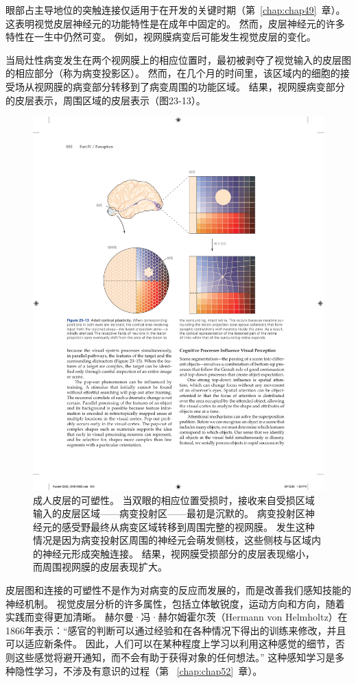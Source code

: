 眼部占主导地位的突触连接仅适用于在开发的关键时期（第~\ref{chap:chap49}~章）。
这表明视觉皮层神经元的功能特性是在成年中固定的。
然而，皮层神经元的许多特性在一生中仍然可变。
例如，视网膜病变后可能发生视觉皮层的变化。


当局灶性病变发生在两个视网膜上的相应位置时，最初被剥夺了视觉输入的皮层图的相应部分（称为病变投影区）。
然而，在几个月的时间里，该区域内的细胞的接受场从视网膜的病变部分转移到了病变周围的功能区域。
结果，视网膜病变部分的皮层表示，周围区域的皮层表示（图23-13）。


\begin{figure}[htbp]
	\centering
	\includegraphics[width=0.7\linewidth]{chap23/fig_23_13}
	\caption{成人皮层的可塑性。
		当双眼的相应位置受损时，接收来自受损区域输入的皮层区域——病变投射区——最初是沉默的。
		病变投射区神经元的感受野最终从病变区域转移到周围完整的视网膜。
		发生这种情况是因为病变投射区周围的神经元会萌发侧枝，这些侧枝与区域内的神经元形成突触连接。
		结果，视网膜受损部分的皮层表现缩小，而周围视网膜的皮层表现扩大。}
	\label{fig:23_13}
\end{figure}


皮层图和连接的可塑性不是作为对病变的反应而发展的，而是改善我们感知技能的神经机制。
视觉皮层分析的许多属性，包括立体敏锐度，运动方向和方向，随着实践而变得更加清晰。
赫尔曼·冯·赫尔姆霍尔茨（Hermann von Helmholtz）在1866年表示：“感官的判断可以通过经验和在各种情况下得出的训练来修改，并且可以适应新条件。
因此，人们可以在某种程度上学习以利用这种感觉的细节，否则这些感觉将避开通知，而不会有助于获得对象的任何想法。” 
这种感知学习是多种隐性学习，不涉及有意识的过程（第 ~\ref{chap:chap52}~章）。


